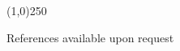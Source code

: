 \documentclass[margin,line, 11pt]{resume}
\begin{document}
\begin{resume}
%      
     

     



    \vspace{-5mm}
    \line(1,0){250}
    
     \large References available upon request
\end{resume}
\end{document}
